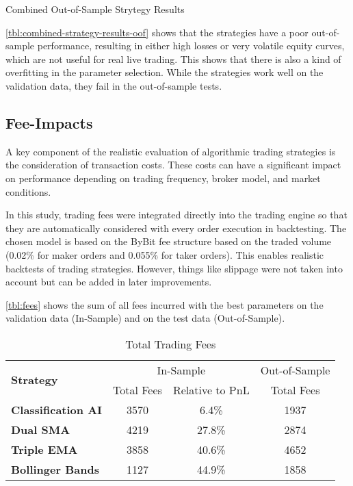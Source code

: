 \begin{table}[H]
    
    \caption{Combined Out-of-Sample Strytegy Results}
    \label{tbl:combined-strategy-results-oof}
\end{table}


\noindent
\autoref{tbl:combined-strategy-results-oof} shows that the strategies have a poor out-of-sample performance, resulting in either high losses or very volatile equity curves, which are not useful for real live trading.
This shows that there is also a kind of overfitting in the parameter selection.
While the strategies work well on the validation data, they fail in the out-of-sample tests.

\subsection{Fee-Impacts}

A key component of the realistic evaluation of algorithmic trading strategies is the consideration of transaction costs.
These costs can have a significant impact on performance depending on trading frequency, broker model, and market conditions.

In this study, trading fees were integrated directly into the trading engine so that they are automatically considered with every order execution in backtesting.
The chosen model is based on the ByBit fee structure based on the traded volume (0.02\% for maker orders and 0.055\% for taker orders).
This enables realistic backtests of trading strategies.
However, things like slippage were not taken into account but can be added in later improvements.

\autoref{tbl:fees} shows the sum of all fees incurred with the best parameters on the validation data (In-Sample) and on the test data (Out-of-Sample).

\begin{table}[H]
    \centering
    \centering
    \begin{tabular}{l|ccc}
        \toprule
        \multirow{2}{*}{\textbf{Strategy}} & \multicolumn{2}{c}{In-Sample} & Out-of-Sample \\
        & Total Fees & Relative to PnL & Total Fees \\
        \midrule
        \textbf{Classification AI} & 3570       & 6.4\%           & 1937       \\
        \textbf{Dual SMA}          & 4219       & 27.8\%          & 2874       \\
        \textbf{Triple EMA}        & 3858       & 40.6\%          & 4652       \\
        \textbf{Bollinger Bands}   & 1127       & 44.9\%          & 1858       \\
        \bottomrule
    \end{tabular}
    \label{tbl:fees}
    \caption{Total Trading Fees}
\end{table}

